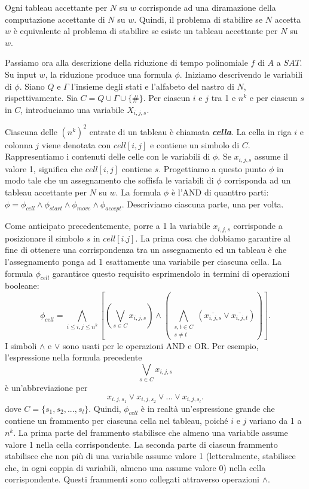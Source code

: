 \documentclass{article}
\begin{document}
Ogni tableau accettante per $N$ su $w$ corrisponde ad una diramazione della computazione accettante di $N$ su $w$. 
Quindi, il problema di stabilire se $N$ accetta $w$ è equivalente al problema di stabilire se esiste un tableau accettante per $N$ su $w$.

Passiamo ora alla descrizione della riduzione di tempo polinomiale $f$ di
$A$ a $SAT$. Su input $w$, la riduzione produce una formula $\phi$.
Iniziamo descrivendo le variabili di $\phi$.
Siano $Q$ e $\Gamma$ l'insieme degli stati e l'alfabeto del nastro di $N$, rispettivamente.
Sia $C = Q \cup \Gamma \cup \{ \# \}$.
Per ciascun $i$ e $j$ tra 1 e $n^k$ e per ciascun $s$ in $C$, introduciamo una variabile $X_{i,j,s}$.

Ciascuna delle $(n^k)^2$ entrate di un tableau è chiamata \textbf{\textit{cella}}.
La cella in riga $i$ e colonna $j$ viene denotata con $cell[i, j]$ e contiene un simbolo di $C$.
Rappresentiamo i contenuti delle celle con le variabili di $\phi$. 
Se $x_{i,j,s}$ assume il valore 1, significa che $cell[i, j]$ contiene $s$.
\newline
Progettiamo a questo punto $\phi$ in modo tale che un assegnamento che soffisfa le variabili di $\phi$ corrisponda ad un tableau accettante per $N$ su $w$.
La formula $\phi$ è l'AND di quanttro parti: $\phi = \phi_{cell} \land \phi_{start} \land \phi_{move} \land \phi_{accept}$.
Descriviamo ciascuna parte, una per volta.

Come anticipato precedentemente, porre a 1 la variabile $x_{i,j,s}$ corrisponde a posizionare il simbolo $s$ in $cell[i.j]$.
La prima cosa che dobbiamo garantire al fine di ottenere una corrispondenza tra un assegnamento ed un tableau è che l'assegnamento ponga ad 1 esattamente una variabile per ciascuna cella.
La formula $\phi_{cell}$ garantisce questo requisito esprimendolo in termini di operazioni booleane:
$$
\phi_{cell} = \bigwedge_{i \leq i,j \leq n^k}  \left[ \left( \bigvee_{s \in C} x_{i,j,s} \right) \land \left(\bigwedge_{\substack{s,t \in C \\s \neq t}} (\overline{x_{i,j,s}} \lor \overline{x_{i,j,t}}) \right) \right].
$$
I simboli $\wedge$ e $\vee$ sono usati per le operazioni AND e OR.
Per esempio, l'espressione nella formula precedente
$$
\bigvee_{s \in C} x_{i,j,s}
$$
è un'abbreviazione per 
$$
x_{i,j,s_1} \lor x_{i,j,s_2} \lor ... \lor x_{i,j,s_{l}}.
$$
dove $C = \{s_1, s_2, ..., s_l\}$.
Quindi, $\phi_{cell}$ è in realtà un'espressione grande che contiene un frammento per ciascuna cella nel tableau, poiché $i$ e $j$ variano da 1 a $n^k$.
La prima parte del frammento stabilisce che almeno una variabile assume valore 1 nella cella corrispondente. 
La seconda parte di ciascun frammento stabilisce che non più di una variabile assume valore  1 (letteralmente, stabilisce che, in ogni coppia di variabili, almeno una assume valore 0) nella cella corrispondente. 
Questi frammenti sono collegati attraverso operazioni $\wedge$.
\end{document}

